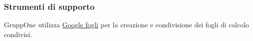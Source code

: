 \documentclass[../../norme-di-progetto.tex]{subfiles}
\begin{document}
\subsubsection{Strumenti di supporto}%
\label{subs:gestione-di-processo/strumenti_di_supporto}

GruppOne utilizza \href{https://www.google.com/sheets/about/}{Google fogli} per la creazione e condivisione dei fogli di calcolo condivisi.
\end{document}
